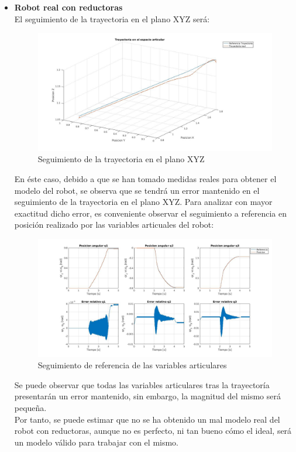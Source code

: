 \begin{itemize}
	\item \textbf{Robot real con reductoras} \\
	El seguimiento de la trayectoria en el plano XYZ será:

	\begin{figure}[h!]
		\centering
		\includegraphics[width=.8\textwidth]{exp3_trayPDreal}
		\caption{Seguimiento de la trayectoria en el plano XYZ}
	\end{figure}

	En éste caso, debido a que se han tomado medidas reales para obtener el modelo del robot, se observa que se tendrá un error mantenido en el seguimiento de la trayectoria en el plano XYZ. Para analizar con mayor exactitud dicho error, es conveniente observar el seguimiento a referencia en posición realizado por las variables articuales del robot:

	\begin{figure}[h!]
		\centering
		\includegraphics[width=.8\textwidth]{exp3_posPDrealCR}
		\caption{Seguimiento de referencia de las variables articulares}
	\end{figure}

Se puede observar que todas las variables articulares tras la trayectoría presentarán un error mantenido, sin embargo, la magnitud del mismo será pequeña.\\
Por tanto, se puede estimar que no se ha obtenido un mal modelo real del robot con reductoras, aunque no es perfecto, ni tan bueno cómo el ideal, será un modelo válido para trabajar con el mismo.

\end{itemize}

